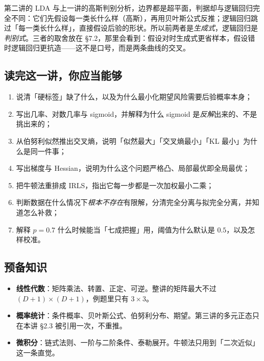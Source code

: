 \documentclass[11pt,a4paper,fontset=windows,zihao=-4]{ctexart}
\begin{document}
\begin{add}[它与前两讲的关系]
第二讲的 LDA 与上一讲的高斯判别分析，边界都是超平面，判据却与逻辑回归完全不同：它们先假设每一类长什么样（高斯），再用贝叶斯公式反推；逻辑回归跳过「每一类长什么样」，直接假设后验的形状。所以前两者是\emph{生成式}，逻辑回归是\emph{判别式}。三者的取舍放在 \S7.2，那里会看到：假设对时生成式更省样本，假设错时逻辑回归更抗造——这不是口号，而是两条曲线的交叉。
\end{add}

\subsection*{读完这一讲，你应当能够}

\begin{enumerate}[label=\textcolor{navy}{\bfseries\arabic*.},leftmargin=2.2em]
  \item 说清「硬标签」缺了什么，以及为什么最小化期望风险需要后验概率本身；
  \item 写出几率、对数几率与 sigmoid，并解释为什么 sigmoid 是\emph{反解}出来的、不是挑出来的；
  \item 从伯努利似然推出交叉熵，说明「似然最大」「交叉熵最小」「KL 最小」为什么是同一件事；
  \item 写出梯度与 Hessian，说明为什么这个问题严格凸、局部最优即全局最优；
  \item 把牛顿法重排成 IRLS，指出它每一步都是一次加权最小二乘；
  \item 判断数据在什么情况下\emph{根本不存在}有限解，分清完全分离与拟完全分离，并知道怎么补救；
  \item 解释 $p=0.7$ 什么时候能当「七成把握」用，阈值为什么默认是 $0.5$，以及怎样校准。
\end{enumerate}

\subsection*{预备知识}

\begin{itemize}
  \item \textbf{线性代数}：矩阵乘法、转置、正定、可逆。整讲的矩阵最大不过 $(D+1)\times(D+1)$，例题里只有 $3\times3$。
  \item \textbf{概率统计}：条件概率、贝叶斯公式、伯努利分布、期望。第三讲的多元正态只在本讲 \S2.3 被引用一次，不重推。
  \item \textbf{微积分}：链式法则、一阶与二阶条件、泰勒展开。牛顿法只用到「二次近似」这一条直觉。
\end{itemize}
\end{document}
